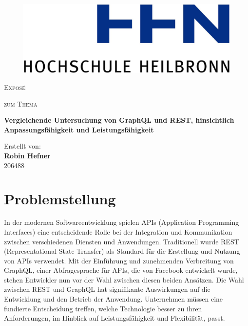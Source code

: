 \documentclass[a4paper, 12pt]{article}
\title{\Thema}
\author{\Autor}
\date{\today}
\newcommand{\Thema}{Vergleichende Untersuchung von GraphQL und REST, hinsichtlich Anpassungsfähigkeit und Leistungsfähigkeit}
\newcommand{\Autor}{Robin Hefner}
\newcommand{\Matrikelnummer}{206488}
\newcommand{\DeckblattTextEins}{Exposé}
\begin{document}
\begin{titlepage}
\begin{figure}[hbtp]
	\centering
	\includegraphics[scale=0.075]{img/logo.jpg}
\end{figure}
\begin{center}
\vspace{1.5cm}
{\scshape\large \DeckblattTextEins \par}
\vspace{1cm}
{\scshape\large zum Thema\par}
\vspace{1.5cm}
{\LARGE\bfseries \Thema \par}
\vfill
\vfill
{Erstellt von:\\ {\bfseries \Autor}\\ \Matrikelnummer\\ \par}
\vspace{1cm}
\end{center}
\end{titlepage}

\section{Problemstellung}
In der modernen Softwareentwicklung spielen APIs (Application Programming Interfaces) eine entscheidende Rolle bei der Integration und Kommunikation zwischen verschiedenen Diensten und Anwendungen. Traditionell wurde REST (Representational State Transfer) als Standard für die Erstellung und Nutzung von APIs verwendet. Mit der Einführung und
zunehmenden Verbreitung von GraphQL, einer Abfragesprache für APIs, die von Facebook entwickelt wurde, stehen Entwickler nun vor der Wahl zwischen diesen beiden Ansätzen. Die Wahl zwischen REST und GraphQL hat signifikante Auswirkungen auf die Entwicklung und den Betrieb der Anwendung. Unternehmen müssen eine fundierte Entscheidung treffen, welche Technologie besser zu ihren Anforderungen, im Hinblick auf Leistungsfähigkeit und Flexibilität, passt.
\end{document}
